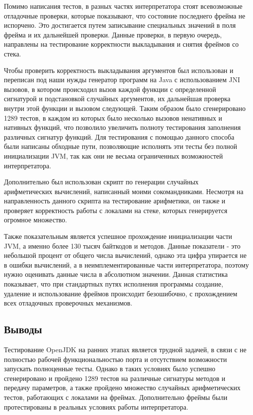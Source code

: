 Помимо написания тестов, в разных частях интерпретатора стоят всевозможные отладочные проверки, которые показывают, что состояние последнего фрейма не испорчено. Это достигается путем записывание специальных значений в поля фрейма и их дальнейшей проверки. Данные проверки, в первую очередь, направлены на тестирование корректности выкладывания и снятия фреймов со стека.

Чтобы проверить корректность выкладывания аргументов был использован и переписан под наши нужды генератор программ на Java с использованием JNI вызовов, в котором происходил вызов каждой функции с определенной сигнатурой и подстановкой случайных аргументов, их дальнейшая проверка внутри этой функции и вызовом следующей. Таким образом было сгенерировано 1289 тестов, в каждом из которых было несколько вызовов ненативных и нативных функций, что позволило увеличить полноту тестирования заполнения различных сигнатур функций. Для тестирования с помощью данного способа были написаны обходные пути, позволяющие исполнять эти тесты без полной инициализации JVM, так как они не весьма ограниченных возможностей интерпретатора.

Дополнительно был использован скрипт по генерации случайных арифметических вычислений, написанный моими сокомандниками. Несмотря на направленность данного скрипта на тестирование арифметики, он также и проверяет корректность работы с локалами на стеке, которых генерируется огромное множество.

Также показательным является успешное прохождение инициализации части JVM, а именно более 130 тысяч байткодов и  методов. Данные показатели - это небольшой процент от общего числа вычислений, однако эта цифра упирается не в ошибки вычислений, а в неимплементированные части интерпретатора, поэтому нужно оценивать данные числа в абсолютном значении. Данная статистика показывает, что при стандартных путях исполнения программы создание, удаление и использование фреймов происходит безошибочно, с прохождением всех отладочных проверочных механизмов.



\subsection{Выводы}

Тестирование OpenJDK на ранних этапах является трудной задачей, в связи с не полностью рабочей функциональностью порта и отсутствием возможности запускать полноценные тесты. Однако в таких условиях было успешно сгенерировано и пройдено 1289 тестов на различные сигнатуры методов и передачу параметров, а также пройдено множество случайных арифметических тестов, работающих с локалами на фреймах. Дополнительно фреймы были протестированы в реальных условиях работы интерпретатора.



